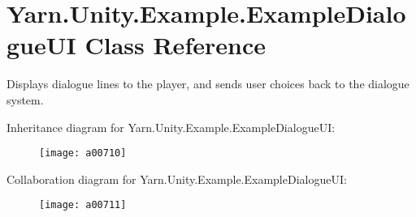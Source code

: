 \hypertarget{a00097}{\section{Yarn.\-Unity.\-Example.\-Example\-Dialogue\-U\-I Class Reference}
\label{a00097}
}


Displays dialogue lines to the player, and sends user choices back to the dialogue system.  




Inheritance diagram for Yarn.\-Unity.\-Example.\-Example\-Dialogue\-U\-I\-:
\nopagebreak
\begin{figure}[H]
\begin{center}
\leavevmode
\texttt{[image: a00710]}
\end{center}
\end{figure}


Collaboration diagram for Yarn.\-Unity.\-Example.\-Example\-Dialogue\-U\-I\-:
\nopagebreak
\begin{figure}[H]
\begin{center}
\leavevmode
\texttt{[image: a00711]}
\end{center}
\end{figure}
